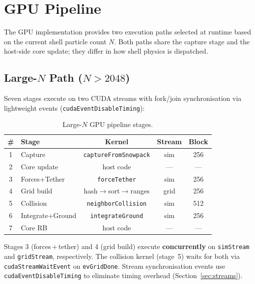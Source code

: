 \section{GPU Pipeline}
\label{sec:pipeline}

The GPU implementation provides two execution paths selected at runtime based
on the current shell particle count $N$. Both paths share the capture stage and
the host-side core update; they differ in how shell physics is dispatched.

\subsection{Large-$N$ Path ($N > 2048$)}
\label{sec:large_n}

Seven stages execute on two CUDA streams with fork/join synchronisation via
lightweight events (\texttt{cudaEventDisableTiming}):

\begin{table}[H]
  \caption{Large-$N$ GPU pipeline stages.}
  \label{tab:pipeline_large}
  \centering
  \scriptsize
  \begin{tabular}{@{}clccc@{}}
    \toprule
    \textbf{\#} & \textbf{Stage} & \textbf{Kernel} & \textbf{Stream} & \textbf{Block} \\
    \midrule
    1 & Capture         & \texttt{captureFromSnowpack}  & sim  & 256 \\
    2 & Core update     & host code                     & ---  & --- \\
    3 & Forces+Tether   & \texttt{forceTether}          & sim  & 256 \\
    4 & Grid build      & hash$\to$sort$\to$ranges      & grid & 256 \\
    5 & Collision       & \texttt{neighborCollision}    & sim  & 512 \\
    6 & Integrate+Ground& \texttt{integrateGround}      & sim  & 256 \\
    7 & Core RB         & host code                     & ---  & --- \\
    \bottomrule
  \end{tabular}
\end{table}

Stages 3 (forces\,+\,tether) and 4 (grid build) execute \textbf{concurrently}
on \texttt{simStream} and \texttt{gridStream}, respectively. The collision
kernel (stage~5) waits for both via \texttt{cudaStreamWaitEvent} on
\texttt{evGridDone}. Stream synchronisation events use
\texttt{cudaEventDisableTiming} to eliminate timing overhead (Section~\ref{sec:streams}).

